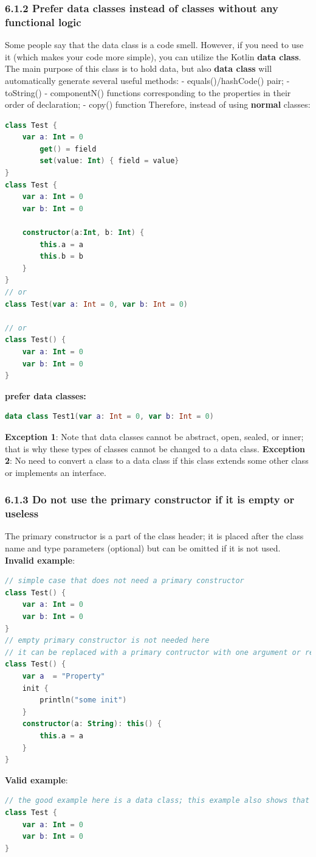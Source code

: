 \subsubsection*{\textbf{6.1.2 Prefer data classes instead of classes without any functional logic}}
\leavevmode\newline
\label{sec:6.1.2}
Some people say that the data class is a code smell. However, if you need to use it (which makes your code more simple), you can utilize the Kotlin \textbf{data class}. The main purpose of this class is to hold data,
but also \textbf{data class} will automatically generate several useful methods:
- equals()/hashCode() pair;
- toString()
- componentN() functions corresponding to the properties in their order of declaration;
- copy() function
Therefore, instead of using \textbf{normal} classes:
\begin{lstlisting}[language=Kotlin]
class Test {
    var a: Int = 0
        get() = field
        set(value: Int) { field = value}
}
class Test {
    var a: Int = 0
    var b: Int = 0

    constructor(a:Int, b: Int) {
        this.a = a
        this.b = b
    }
}
// or
class Test(var a: Int = 0, var b: Int = 0)

// or
class Test() {
    var a: Int = 0
    var b: Int = 0
}
\end{lstlisting}
\textbf{prefer data classes:}
\begin{lstlisting}[language=Kotlin]
data class Test1(var a: Int = 0, var b: Int = 0)
\end{lstlisting}
\textbf{Exception 1}: Note that data classes cannot be abstract, open, sealed, or inner; that is why these types of classes cannot be changed to a data class.
\textbf{Exception 2}: No need to convert a class to a data class if this class extends some other class or implements an interface.
\subsubsection*{\textbf{6.1.3 Do not use the primary constructor if it is empty or useless}}
\leavevmode\newline
\label{sec:6.1.3}
The primary constructor is a part of the class header; it is placed after the class name and type parameters (optional) but can be omitted if it is not used.
\textbf{Invalid example}:
\begin{lstlisting}[language=Kotlin]
// simple case that does not need a primary constructor
class Test() {
    var a: Int = 0
    var b: Int = 0
}
// empty primary constructor is not needed here
// it can be replaced with a primary contructor with one argument or removed
class Test() {
    var a  = "Property"
    init {
        println("some init")
    }
    constructor(a: String): this() {
        this.a = a
    }
}
\end{lstlisting}
\textbf{Valid example}:
\begin{lstlisting}[language=Kotlin]
// the good example here is a data class; this example also shows that you should get rid of braces for the primary constructor
class Test {
    var a: Int = 0
    var b: Int = 0
}
\end{lstlisting}
